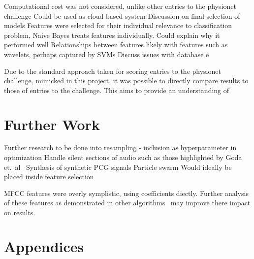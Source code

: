 \documentclass[titlepage, 12pt]{scrartcl} \usepackage{enumitem}
\begin{document}
Computational cost was not considered, unlike other entries to the physionet
challenge
Could be used as cloud based system
Discussion on final selection of models
Features were selected for their individual relevance to classification
problem, Naive Bayes treats features individually. Could explain why it
performed well
Relationships between features likely with features such as wavelets, perhaps
captured by SVMs
Discuss issues with database e


Due to the standard approach taken for scoring entries to the physionet
challenge, mimicked in this project, it was possible to directly compare results
to those of entries to the challenge. This aims to provide an understanding of 

\section{Further Work}\label{FurtherWork}
Further research to be done into resampling - inclusion as hyperparameter in
optimization
Handle silent sections of audio such as those highlighted by Goda et.\
al~\parencite{Goda2016}
Synthesis of synthetic PCG signals
Particle swarm Would ideally be placed inside feature selection

MFCC features were overly symplistic, using coefficients diectly. Further
analysis of these features as demonstrated in other
algorithms~\parencite{Zabihi2016} may improve there impact on results.

\appendix
\section*{Appendices}
\renewcommand{\thesubsection}{\Alph{subsection}}
\end{document}
